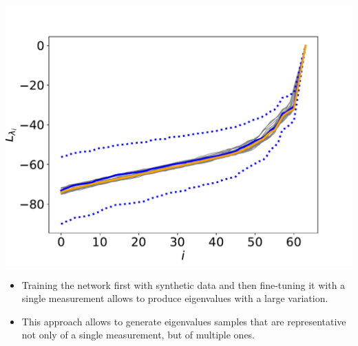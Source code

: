 \documentclass[12pt,pdftex,16x10]{elpres} %
\begin{document}
\begin{psli}
  \begin{minipage}[b][0.7\textheight][t]{0.5\textwidth}
    \centering
    \includegraphics[width=1.2\textwidth]{figs/outliers_evals_dB_wgangp.pdf}
  \end{minipage}
  \begin{minipage}[b][0.7\textheight][t]{0.5\textwidth}
    \begin{itemize}
        \item Training the network first with synthetic data and then fine-tuning it with a single measurement allows to produce eigenvalues with a large variation.
        \item This approach allows to generate eigenvalues samples that are representative not only of a single measurement, but of multiple ones.
    \end{itemize}
  \end{minipage}
\end{psli}
\end{document}
